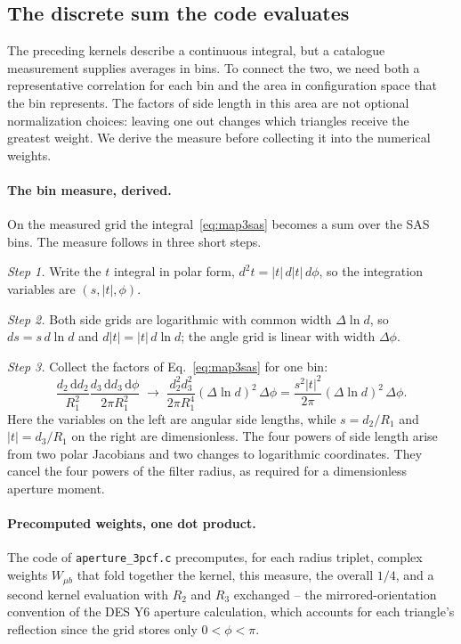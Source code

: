 \documentclass[11pt]{article}
\newcommand{\us}{\_\allowbreak}
\numberwithin{equation}{section}
\begin{document}
\subsection{The discrete sum the code evaluates}
\label{sec:gridsum}

The preceding kernels describe a continuous integral, but a catalogue
measurement supplies averages in bins. To connect the two, we need both
a representative correlation for each bin and the area in configuration
space that the bin represents. The factors of side length in this area
are not optional normalization choices: leaving one out changes which
triangles receive the greatest weight. We derive the measure before
collecting it into the numerical weights.

\paragraph{The bin measure, derived.}
On the measured grid the integral~\eqref{eq:map3sas} becomes a sum
over the SAS bins.  The measure follows in three short steps.

\emph{Step 1.}  Write the $t$ integral in polar form,
$d^2 t = |t|\, d|t|\, d\phi$, so the integration variables are
$(s, |t|, \phi)$.

\emph{Step 2.}  Both side grids are logarithmic with common width
$\Delta\ln d$, so $ds = s\, d\ln d$ and $d|t| = |t|\, d\ln d$; the
angle grid is linear with width $\Delta\phi$.

\emph{Step 3.}  Collect the factors of Eq.~\eqref{eq:map3sas} for
one bin:
\begin{equation}
  \frac{d_2\,\mathrm{d}d_2}{R_1^2}
  \frac{d_3\,\mathrm{d}d_3\,\mathrm{d}\phi}{2\pi R_1^2}
  \;\longrightarrow\;
  \frac{d_2^2d_3^2}{2\pi R_1^4}
  (\Delta\ln d)^2\,\Delta\phi
  =\frac{s^2|t|^2}{2\pi}(\Delta\ln d)^2\,\Delta\phi .
  \label{eq:measure}
\end{equation}
Here the variables on the left are angular side lengths, while
$s=d_2/R_1$ and $|t|=d_3/R_1$ on the right are dimensionless.
The four powers of side length arise from two polar Jacobians and two
changes to logarithmic coordinates. They cancel the four powers of the
filter radius, as required for a dimensionless aperture moment.

\paragraph{Precomputed weights, one dot product.}
The code of \texttt{aperture\us 3pcf.c} precomputes, for each radius
triplet, complex weights $W_{\mu b}$ that fold together the kernel,
this measure, the overall $1/4$, and a second kernel evaluation with
$R_2$ and $R_3$ exchanged -- the mirrored-orientation convention of
the DES Y6 aperture calculation, which accounts for each triangle's
reflection since the grid stores only $0 < \phi < \pi$.
\end{document}
